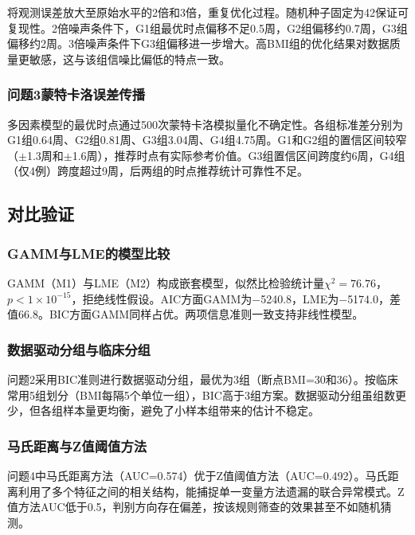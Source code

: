将观测误差放大至原始水平的2倍和3倍，重复优化过程。随机种子固定为42保证可复现性。2倍噪声条件下，G1组最优时点偏移不足0.5周，G2组偏移约0.7周，G3组偏移约2周。3倍噪声条件下G3组偏移进一步增大。高BMI组的优化结果对数据质量更敏感，这与该组信噪比偏低的特点一致。

\subsubsection{问题3蒙特卡洛误差传播}

多因素模型的最优时点通过500次蒙特卡洛模拟量化不确定性。各组标准差分别为G1组0.64周、G2组0.81周、G3组3.04周、G4组4.75周。G1和G2组的置信区间较窄（$\pm$1.3周和$\pm$1.6周），推荐时点有实际参考价值。G3组置信区间跨度约6周，G4组（仅4例）跨度超过9周，后两组的时点推荐统计可靠性不足。

\subsection{对比验证}

\subsubsection{GAMM与LME的模型比较}

GAMM（M1）与LME（M2）构成嵌套模型，似然比检验统计量$\chi^2=76.76$，$p<1\times10^{-15}$，拒绝线性假设。AIC方面GAMM为$-$5240.8，LME为$-$5174.0，差值66.8。BIC方面GAMM同样占优。两项信息准则一致支持非线性模型。

\subsubsection{数据驱动分组与临床分组}

问题2采用BIC准则进行数据驱动分组，最优为3组（断点BMI=30和36）。按临床常用5组划分（BMI每隔5个单位一组），BIC高于3组方案。数据驱动分组虽组数更少，但各组样本量更均衡，避免了小样本组带来的估计不稳定。

\subsubsection{马氏距离与Z值阈值方法}

问题4中马氏距离方法（AUC=0.574）优于Z值阈值方法（AUC=0.492）。马氏距离利用了多个特征之间的相关结构，能捕捉单一变量方法遗漏的联合异常模式。Z值方法AUC低于0.5，判别方向存在偏差，按该规则筛查的效果甚至不如随机猜测。
